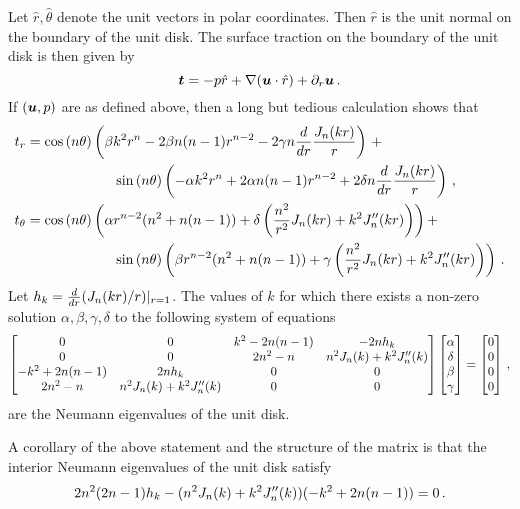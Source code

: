 Let $\hat{r}, \hat{\theta}$ denote the unit vectors in polar coordinates.
Then  $\hat{r}$ is the unit normal on the boundary of the unit disk.
The surface traction on the boundary of the unit disk is then given by 
\begin{equation}
{\boldsymbol t} = -p \hat{r} + \nabla ({\boldsymbol u} \cdot \hat{r}) + \partial_{r} {\boldsymbol u} \, .
\end{equation}
If $({\boldsymbol u},p)$ are as defined above, then 
a long but tedious calculation shows that
\begin{equation}
\begin{aligned}
t_{r} &= \cost \left( \beta k^2 r^{n} -2\beta n(n-1)r^{n-2} - 2\gamma n \ddr \frac{\jnkr}{r}  \right) \, + \\
& \hspace*{15ex} \sint \left(-\alpha k^2 r^{n} + 2 \alpha n(n-1)r^{n-2} + 2 \delta n \ddr \frac{\jnkr}{r} \right) \, , \\
t_{\theta} &= \cost \left( \alpha r^{n-2} (n^2 + n(n-1)) + \delta \left( \frac{n^2}{r^2} \jnkr + k^2 \jnppkr \right)  \right) + \\
& \hspace*{15ex} \sint \left( \beta r^{n-2} (n^2 + n(n-1)) + \gamma \left( \frac{n^2}{r^2} \jnkr + k^2 \jnppkr \right) \right) \, .
\end{aligned}
\end{equation}
Let $h_{k} = \frac{d}{dr} (J_{n}(kr)/r)|_{r=1}$.
The values of $k$ for which there exists a non-zero solution $\alpha,\beta,\gamma,\delta$ 
to the following system of equations
\begin{equation}
\begin{bmatrix}
0 & 0 & k^2 - 2n(n-1) & -2nh_{k} \\
0 & 0 & 2n^2 -n & n^2 J_{n}(k) + k^2 J_{n}''(k) \\
-k^2 + 2n(n-1) & 2nh_{k} & 0 & 0 \\
2n^2 -n & n^2 J_{n}(k) + k^2 J_{n}''(k) & 0 & 0
\end{bmatrix}
\begin{bmatrix}
\alpha \\ \delta \\ \beta \\ \gamma
\end{bmatrix}
=
\begin{bmatrix}
0 \\ 0 \\ 0 \\ 0
\end{bmatrix}
\, ,
\end{equation}
are the Neumann eigenvalues of the unit disk.

A corollary of the above statement and the structure of the matrix is that
the interior Neumann eigenvalues of the unit disk satisfy
\begin{equation}
2n^2(2n-1)h_{k} - (n^2 J_{n}(k) + k^2 J_{n}''(k))(-k^2 + 2n(n-1)) = 0 \, .
\end{equation}

